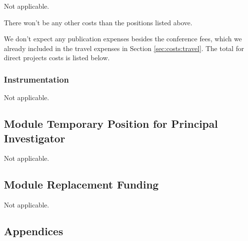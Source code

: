 \documentclass{scrartcl}
\begin{document}




Not applicable. 


There won't be any other costs than the positions listed above. 


We don't expect any publication expenses besides the conference fees, which we already included in the travel expenses in Section \ref{sec:costs:travel}. The total for direct projects costs is listed below. 


\subsubsection{Instrumentation}

Not applicable. 

\subsection{Module Temporary Position for Principal Investigator}

Not applicable. 

\subsection{Module Replacement Funding}

Not applicable. 

\subsection*{Appendices}

\end{document}
